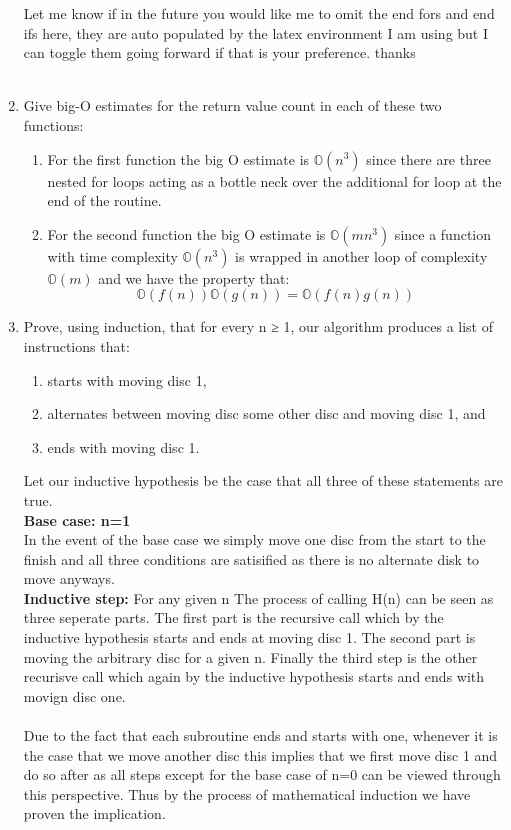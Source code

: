\documentclass[11pt]{article}
\theoremstyle{definition}  %
\begin{document}
\begin{enumerate}
\begin{algorithm}
\begin{algorithmic}[1]
    \end{algorithmic}
  \end{algorithm}
  Let me know if in the future you would like me to omit the end fors and end ifs here, they are auto populated by the latex environment I am using but I can toggle them going forward if that is your preference. thanks \\\\
  \item  Give big-O estimates for the return value count in each of these two functions:
  \newcommand{\bO}{\mathbb{O}}
  \begin{enumerate}
    \item For the first function the big O estimate is $\bO(n^3)$ since there are three nested for loops acting as a bottle neck over the additional for loop at the end of the routine.
    \item For the second function the big O estimate is $\bO(mn^3)$ since a function with time complexity $\bO(n^3)$ is wrapped in another loop of complexity $\bO(m)$ and we have the property that:
    \[
      \bO(f(n))\bO(g(n))=\bO(f(n)g(n))
    \]
  \end{enumerate}
  \item  Prove,
  using induction, that for every n ≥ 1, our algorithm produces a list of instructions
  that:
  \begin{enumerate}
    \item starts with moving disc 1,
    \item alternates between moving disc some other disc and moving disc 1, and
    \item ends with moving disc 1.
  \end{enumerate}
Let our inductive hypothesis be the case that all three of these statements are true. \\
\textbf{Base case: n=1}\\
In the event of the base case we simply move one disc from the start to the finish and all three conditions are satisified as there is no alternate disk to move anyways.\\
\textbf{Inductive step:}
For any given n The process of calling H(n) can be seen as three seperate parts. The first part is the recursive call which by the inductive hypothesis starts and ends at moving disc 1. The second part is moving the arbitrary disc for a given n. Finally the third step is the other recurisve call which again by the inductive hypothesis starts and ends with movign disc one. \\\\
Due to the fact that each subroutine ends and starts with one, whenever it is the case that we move another disc this implies that we first move disc 1 and do so after as all steps except for the base case of n=0 can be viewed through this perspective. Thus by the process of mathematical induction we have proven the implication.
\end{enumerate}
\end{document}
